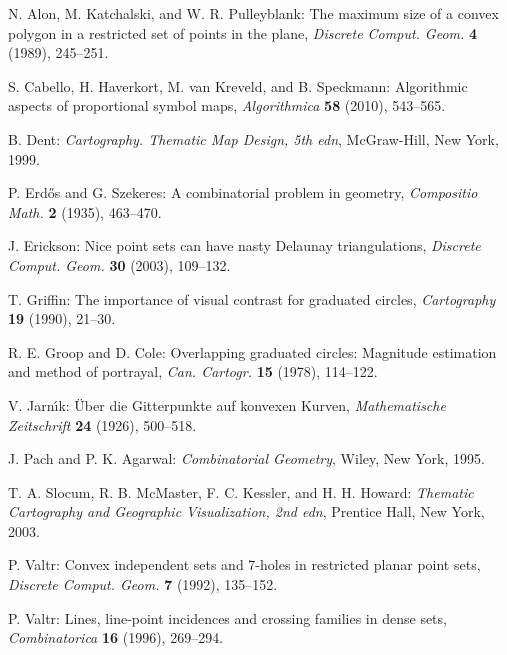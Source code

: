 \documentclass[11pt]{article}
\begin{document}
	\begin{thebibliography}{}

    N. Alon, M. Katchalski, and W. R. Pulleyblank: The maximum size of a convex polygon in a restricted set of points in the plane, {\em Discrete Comput. Geom.} {\bf 4} (1989), 245--251.

	S. Cabello, H. Haverkort, M. van Kreveld, and B. Speckmann:
    Algorithmic aspects of proportional symbol maps, {\em Algorithmica} {\bf 58} (2010), 543--565.

    B. Dent: {\em Cartography. Thematic Map Design, 5th edn}, McGraw-Hill, New York, 1999.

    P. Erd\H os and G. Szekeres: A combinatorial problem in geometry, {\em Compositio Math.} {\bf 2} (1935), 463--470.
    
     J. Erickson: Nice point sets can have nasty Delaunay triangulations, {\em Discrete Comput. Geom.} {\bf 30} (2003), 109--132.

    T. Griffin: The importance of visual contrast for graduated circles, {\em Cartography} {\bf 19} (1990), 21--30.

    R. E. Groop and D. Cole: Overlapping graduated circles: Magnitude estimation and method of portrayal, {\em Can. Cartogr.} {\bf 15} (1978), 114--122.

    V. Jarn\'{\i}k: \"Uber die Gitterpunkte auf konvexen Kurven, {\em Mathematische Zeitschrift} {\bf 24} (1926), 500--518.

    J. Pach and P. K. Agarwal: {\em Combinatorial Geometry}, Wiley, New York, 1995.

    T. A. Slocum, R. B. McMaster, F. C. Kessler, and H. H. Howard: {\em Thematic Cartography and Geographic Visualization, 2nd edn}, Prentice Hall, New York, 2003.

    P. Valtr: Convex independent sets and 7-holes in restricted planar point sets, {\em Discrete Comput. Geom.} {\bf 7} (1992), 135--152.

    P. Valtr: Lines, line-point incidences and crossing families in dense sets, {\em Combinatorica} {\bf 16} (1996), 269--294.

\end{thebibliography}
\end{document}
